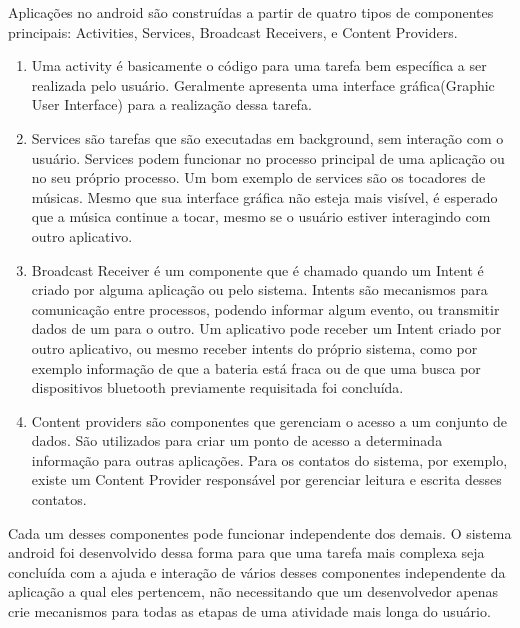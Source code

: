 Aplicações no android são construídas a partir de quatro tipos de componentes principais: Activities, Services, Broadcast Receivers, e Content Providers. 

\begin{enumerate}
\item Uma activity é basicamente o código para uma tarefa bem específica a ser realizada pelo usuário. Geralmente apresenta uma interface gráfica(Graphic User Interface) para a realização dessa tarefa. 

\item Services são tarefas que são executadas em background, sem interação com o usuário. Services podem funcionar no processo principal de uma aplicação ou no seu próprio processo. Um bom exemplo de services são os tocadores de músicas. Mesmo que sua interface gráfica não esteja mais visível, é esperado que a música continue a tocar, mesmo se o usuário estiver interagindo com outro aplicativo. 

\item Broadcast Receiver é um componente que é chamado quando um Intent é criado por alguma aplicação ou pelo sistema. Intents são mecanismos para comunicação entre processos, podendo informar algum evento, ou transmitir dados de um para o outro.
Um aplicativo pode receber um Intent criado por outro aplicativo, ou mesmo receber intents do próprio sistema, como por exemplo informação de que a bateria está fraca ou de que uma busca por dispositivos bluetooth previamente requisitada foi concluída. 

\item Content providers são componentes que gerenciam o acesso a um conjunto de dados. São utilizados para criar um ponto de acesso a determinada informação para outras aplicações. Para os contatos do sistema, por exemplo, existe um Content Provider responsável por gerenciar leitura e escrita desses contatos. 
\end{enumerate}


Cada um desses componentes pode funcionar independente dos demais. O sistema android foi desenvolvido dessa forma para que uma tarefa mais complexa seja concluída com a ajuda e interação de vários desses componentes independente da aplicação a qual eles pertencem, não necessitando que um desenvolvedor apenas crie mecanismos para todas as etapas de uma atividade mais longa do usuário.  

